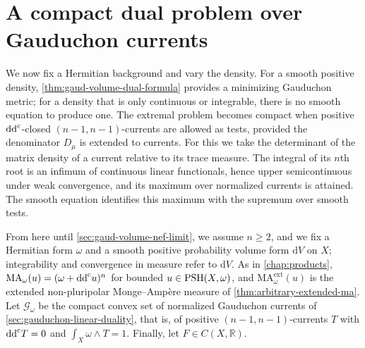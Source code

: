\section{A compact dual problem over Gauduchon currents}
\label{sec:weak-gauduchon-duality}

We now fix a Hermitian background and vary the density. For a smooth positive density, \cref{thm:gaud-volume-dual-formula} provides a minimizing Gauduchon metric; for a density that is only continuous or integrable, there is no smooth equation to produce one. The extremal problem becomes compact when positive $\mathrm{dd}^{\mathrm{c}}$-closed $(n-1,n-1)$-currents are allowed as tests, provided the denominator $D_\mu$ is extended to currents. For this we take the determinant of the matrix density of a current relative to its trace measure. The integral of its $n$th root is an infimum of continuous linear functionals, hence upper semicontinuous under weak convergence, and its maximum over normalized currents is attained. The smooth equation identifies this maximum with the supremum over smooth tests.

From here until \cref{sec:gaud-volume-nef-limit}, we assume $n\geq2$, and we fix a Hermitian form $\omega$ and a smooth positive probability volume form $\mathrm{d}V$ on $X$; integrability and convergence in measure refer to $\mathrm{d}V$. As in \cref{chap:products}, $\mathrm{MA}_\omega(u)=(\omega+\mathrm{dd}^{\mathrm{c}} u)^n$ for bounded $u\in\mathrm{PSH}(X,\omega)$, and $\mathrm{MA}^{\mathrm{ext}}_\omega(u)$ is the extended non-pluripolar Monge--Amp\`ere measure of \cref{thm:arbitrary-extended-ma}. Let $\mathscr G_\omega$ be the compact convex set of normalized Gauduchon currents of \cref{sec:gauduchon-linear-duality}, that is, of positive $(n-1,n-1)$-currents $T$ with $\mathrm{dd}^{\mathrm{c}} T=0$ and $\int_X\omega\wedge T=1$. Finally, let $F\in C(X,\mathbb R)$.

